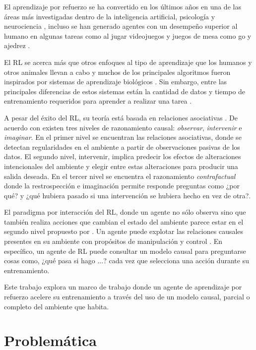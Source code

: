El aprendizaje por refuerzo se ha convertido en los últimos años en una de las áreas
más investigadas dentro de la inteligencia artificial, psicología y neurociencia \cite{botvinick2019reinforcement}, incluso
se han generado agentes con un desempeño superior al humano en algunas tareas como  al jugar videojuegos \cite{mnih2015human, starcraft2019deepmind} y juegos de mesa como go y ajedrez \cite{Silver1140}.

El RL se acerca más que otros enfoques al tipo de aprendizaje que los humanos y otros
animales llevan a cabo y muchos de los principales algoritmos fueron inspirados por 
sistemas de aprendizaje biológicos \cite{sutton_barto_2018}. Sin embargo,
entre las principales diferencias de estos sistemas 
están la cantidad de datos y tiempo de entrenamiento
requeridos para aprender a realizar una tarea \cite{Silver1140}.

A pesar del éxito del RL, su teoría está basada 
en relaciones asociativas \cite{playingagainstnature2018}.
De acuerdo con \cite{pearl2018bookofwhy} existen tres niveles
de razonamiento causal: \textit{observar}, \textit{intervenir}
e \textit{imaginar}.
En el primer nivel se encuentran las 
relaciones asociativas, donde se detectan regularidades
en el ambiente a partir de observaciones pasivas de los datos.
El segundo nivel, intervenir, implica predecir los 
efectos de alteraciones intencionales del ambiente
y elegir entre estas alteraciones  para producir una
salida deseada. En el tercer nivel se encuentra
el razonamiento \textit{contrafactual} donde la restrospección
e imaginación permite responde preguntas como ¿por qué?
y ¿qué hubiera pasado si una intervención se hubiera hecho 
en vez de otra?.


El paradigma por interacción del RL, donde un agente
no sólo observa sino que también realiza acciones que 
cambian el estado del ambiente parece estar 
en el segundo nivel propuesto por \cite{pearl2018bookofwhy}.
Un agente puede explotar las relaciones causales presentes
en su ambiente con propósitos de manipulación y control \cite{woodward2005making}.
En específico, un agente de RL puede consultar un modelo
causal para preguntarse cosas como, ¿qué pasa si hago ...?
cada vez que selecciona una acción durante su entrenamiento.

Este trabajo explora un marco de trabajo donde un agente
de aprendizaje por refuerzo acelere su entrenamiento a través
del uso de un modelo causal, parcial o completo del ambiente
que habita. 


\section{Problemática}

